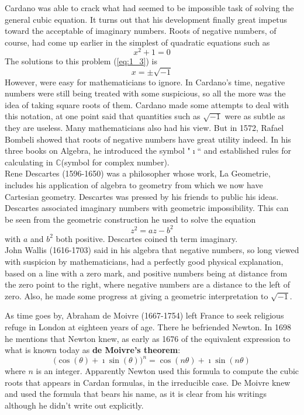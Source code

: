 \documentclass[11pt]{report}
\newcommand{\refn}[1]{(\ref{#1})}
\newcommand{\refx}[1]{\refn{eq:#1}}
\newcommand{\bt}[1]{\textbf{#1}}
\newcommand{\NI}{\noindent}
\newcommand{\imaginary}{\imath}
\newcommand{\complex}{\mathbb{C}}
\begin{document}
	\NI Cardano was able to crack what had seemed to be impossible task of solving the general cubic equation. It turns out that his development finally great impetus toward the acceptable of imaginary numbers. Roots of negative numbers, of course, had come up earlier in the simplest of quadratic equations such as 
	\begin{equation}
		x^2 + 1 = 0\label{eq:1_3}
	\end{equation}
	The solutions to this problem \refx{1_3} is
	\begin{equation}
		x= \pm\sqrt{-1}\label{eq:1_4}
	\end{equation}
	However, were easy for mathematicians to ignore. In Cardano's time, negative numbers were still being treated with some suspicious, so all the more was the idea of taking square roots of them. Cardano made some attempts to deal with this notation, at one point said that quantities such as $\sqrt{-1}$ were as subtle as they are useless. Many mathematicians also had his view. But in 1572, Rafael Bombeli showed that roots of negative numbers have great utility indeed. In his three books on Algebra, he introduced the symbol "$\imaginary$`` and established rules for calculating in $\complex$(symbol for complex number).\\
	
	\NI Rene Descartes (1596-1650) was a philosopher whose work, La Geometrie, includes his application of algebra to geometry from which we now have Cartesian geometry. Descartes was pressed by his friends to public his ideas. Descartes associated imaginary numbers with geometric impossibility. This can be seen from the geometric construction he used to solve the equation
	\begin{equation}
		z^2 = az-b^2\label{eq:1_5}
	\end{equation}
	with $a$ and $b^2$ both positive. Descartes coined th term imaginary.\\
	
	\NI John Wallis (1616-1703) said in his algebra that negative numbers, so long viewed with suspicion by mathematicians, had a perfectly good physical explanation, based on a line with a zero mark, and positive numbers being at distance from the zero point to the right, where negative numbers are a distance to the left of zero. Also, he made some progress at giving a geometric interpretation to $\sqrt{-1}$.
	
	\NI As time goes by, Abraham de Moivre (1667-1754) left France to seek religious refuge in London at eighteen years of age. There he befriended Newton. In 1698 he mentions that Newton knew, as early as 1676 of the equivalent expression to what is known today as \bt{de Moivre's theorem}:
	\begin{equation}
		\Big(\cos(\theta) + \imaginary\sin(\theta)\Big)^n = \cos(n\theta) + \imaginary\sin(n\theta)\label{eq:1_6}
	\end{equation}
	where $n$ is an integer. Apparently Newton used this formula to compute the cubic roots that appears in Cardan formulas, in the irreducible case. De Moivre knew and used the formula that bears his name, as it is clear from his writings although he didn't write out explicitly.\\
	
\end{document}
